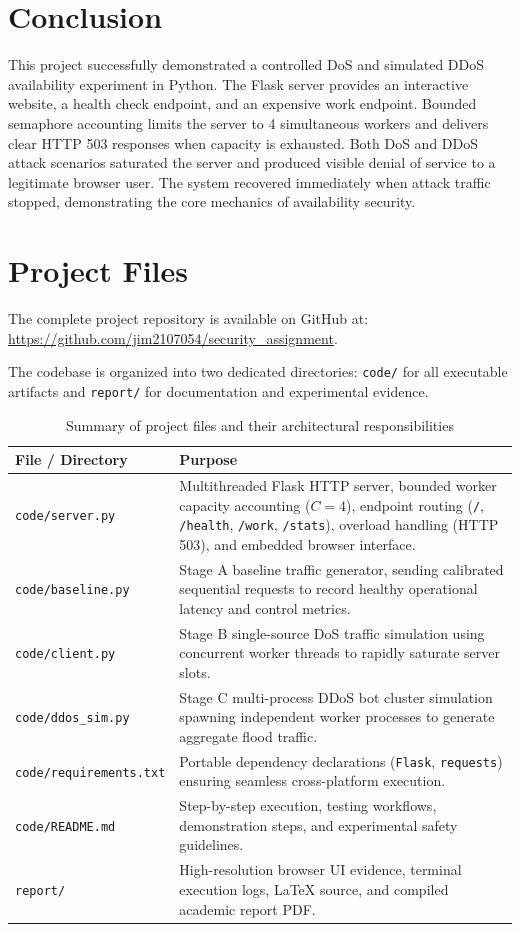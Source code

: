 \documentclass[11pt,a4paper]{article}
\begin{document}
\section{Conclusion}
This project successfully demonstrated a controlled DoS and simulated DDoS availability experiment in Python. The Flask server provides an interactive website, a health check endpoint, and an expensive work endpoint. Bounded semaphore accounting limits the server to 4 simultaneous workers and delivers clear HTTP 503 responses when capacity is exhausted. Both DoS and DDoS attack scenarios saturated the server and produced visible denial of service to a legitimate browser user. The system recovered immediately when attack traffic stopped, demonstrating the core mechanics of availability security.

\appendix
\section{Project Files}
The complete project repository is available on GitHub at: \url{https://github.com/jim2107054/security_assignment}.

The codebase is organized into two dedicated directories: \texttt{code/} for all executable artifacts and \texttt{report/} for documentation and experimental evidence.

\begin{table}[H]
\centering
\small
\caption{Summary of project files and their architectural responsibilities}
\label{tab:project_files}
\begin{tabularx}{\textwidth}{p{4.0cm}X}
\toprule
\textbf{File / Directory} & \textbf{Purpose} \\
\midrule
\texttt{code/server.py} & Multithreaded Flask HTTP server, bounded worker capacity accounting ($C=4$), endpoint routing (\texttt{/}, \texttt{/health}, \texttt{/work}, \texttt{/stats}), overload handling (HTTP 503), and embedded browser interface. \\
\texttt{code/baseline.py} & Stage A baseline traffic generator, sending calibrated sequential requests to record healthy operational latency and control metrics. \\
\texttt{code/client.py} & Stage B single-source DoS traffic simulation using concurrent worker threads to rapidly saturate server slots. \\
\texttt{code/ddos\_sim.py} & Stage C multi-process DDoS bot cluster simulation spawning independent worker processes to generate aggregate flood traffic. \\
\texttt{code/requirements.txt} & Portable dependency declarations (\texttt{Flask}, \texttt{requests}) ensuring seamless cross-platform execution. \\
\texttt{code/README.md} & Step-by-step execution, testing workflows, demonstration steps, and experimental safety guidelines. \\
\texttt{report/} & High-resolution browser UI evidence, terminal execution logs, LaTeX source, and compiled academic report PDF. \\
\bottomrule
\end{tabularx}
\end{table}
\end{document}

